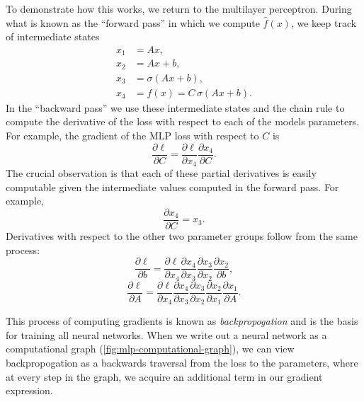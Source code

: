 To demonstrate how this works, we return to the multilayer perceptron. During what is known as the ``forward pass'' in which we compute $\hat f(x)$, we keep track of intermediate states
\begin{equation}
	\begin{aligned}
		x_1 & = Ax,                          \\
		x_2 & = Ax  + b,                     \\
		x_3 & = \sigma(Ax  + b),             \\
		x_4 & = f(x) = C \, \sigma(Ax  + b).
	\end{aligned}
\end{equation}
In the ``backward pass'' we use these intermediate states and the chain rule to compute the derivative of the loss with respect to each of the models parameters.
For example, the gradient of the MLP loss with respect to $C$ is
\begin{equation*}
	\frac{\partial \ell}{\partial C}
	= \frac{\partial \ell}{\partial x_4}
	\frac{\partial x_4}{\partial C}.
\end{equation*}
The crucial observation is that each of these partial derivatives is easily computable given the intermediate values computed in the forward pass. For example,
\begin{equation}
	\frac{\partial x_4}{\partial C} = x_3.
\end{equation}
Derivatives with respect to the other two parameter groups follow from the same process:
\begin{equation*}
	\frac{\partial \ell}{\partial b}
	= \frac{\partial \ell}{\partial x_4}
	\frac{\partial x_4}{\partial x_3}
	\frac{\partial x_3}{\partial x_2}
	\frac{\partial x_2}{\partial b},
\end{equation*}
\begin{equation*}
	\frac{\partial \ell}{\partial A}
	= \frac{\partial \ell}{\partial x_4}
	\frac{\partial x_4}{\partial x_3}
	\frac{\partial x_3}{\partial x_2}
	\frac{\partial x_2}{\partial x_1}
	\frac{\partial x_1}{\partial A}.
\end{equation*}

This process of computing gradients is known as \emph{backpropogation} and is the basis for training all neural networks. When we write out a neural network as a computational graph (\autoref{fig:mlp-computational-graph}), we can view backpropogation as a backwards traversal from the loss to the parameters, where at every step in the graph, we acquire an additional term in our gradient expression.

